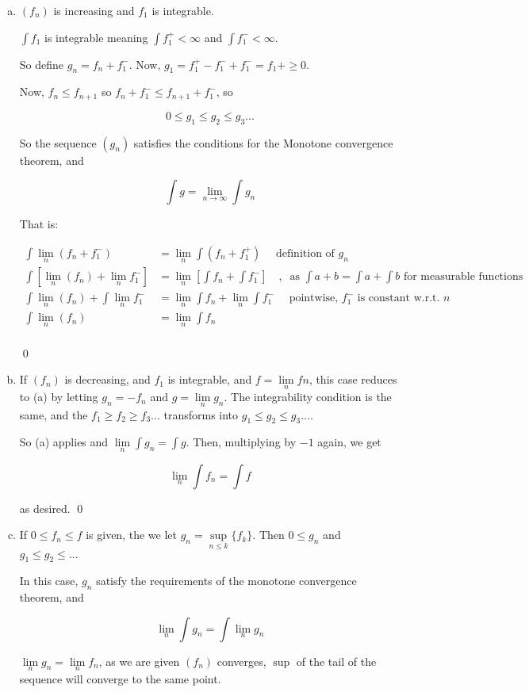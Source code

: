 \documentclass[11pt,oneside]{article}
\numberwithin{equation}{section}
\theoremstyle{definition}
\def\limn{\lim \limits _n}
\begin{document}
\begin{solution}
  \begin{enumerate}[(a)]
  \item
    $(f_n) $ is increasing and $f_1$ is integrable.
    
    $\int f_1$ is integrable meaning $ \int f_1^+  < \infty $ and $\int f_1 ^- <  \infty$.
    
    So define $g_n = f_n + f_1^-$.  Now, $g_1 = f_1^+ - f_1^- + f_1^- = f_1+ \geq 0$.
    
    Now, $f_n \leq f_{n+1}$ so $f_n + f_1^- \leq f_{n+1} + f_1^-$, so
    
    \[
    0 \leq g_1 \leq g_2 \leq g_3 ...
    \]
    
    So the sequence $(g_n)$ satisfies the conditions for the Monotone convergence theorem, and
    
    \[
    \int g = \lim_{n \to \infty} \int g_n
    \]
    
    That is:
    
    \begin{align*}
      \int \limn (f _n + f_1 ^ -) &= \limn \int (f_n + f_1^+) \quad \textrm { definition of } g_n \\ 
      \int \left[ \limn ( f_n) + \limn f_1^- \right] &= \limn \left[ \int f_n + \int f_1^- \right] \quad ,  \ \textrm{ as } \int a + b = \int a + \int b \textrm{ for measurable functions } \\
      \int \limn ( f_n) + \int \limn {f_1^-} &= \limn \int f_n + \limn \int f_1^- \quad \textrm{ pointwise, } f_1^- \textrm{ is constant w.r.t. } n \\
      \int \limn ( f_n) & = \limn \int f_n  \\
    \end{align*}
    
    \qed
    
  \item
    
    If $(f_n)$ is decreasing, and $f_1$ is integrable, and $f = \limn fn$, this case reduces to (a) by letting $g_n = - f_n$ and $g = \limn g_n$.  The integrability
    condition is the same, and the $f_1 \geq f_2 \geq f_3 ...$ transforms into $g_1 \leq g_2 \leq g_3 ...$.
    
    So (a) applies and $ \limn \int g_n = \int g$.  Then, multiplying by $-1$ again, we get
    
    \[
    \limn \int f_n = \int f
    \]
    
    as desired. \qed
    
  \item
    If $0 \leq f_n \leq f$ is given, the we let $g_n = \sup \limits _ {n \leq k} \{f_k\}$.  Then $0 \leq g_n$ and $g_1 \leq g_2 \leq ...$

    In this case, $g_n$ satisfy the requirements of the monotone convergence theorem, and

    \[
    \limn \int g_n = \int \limn g_n
    \]

    $ \limn g_n = \limn f_n$, as we are given $(f_n)$ converges,
    $\sup$ of the tail of the sequence will converge to the same
    point.
  \end{enumerate}
\end{solution}
\end{document}
